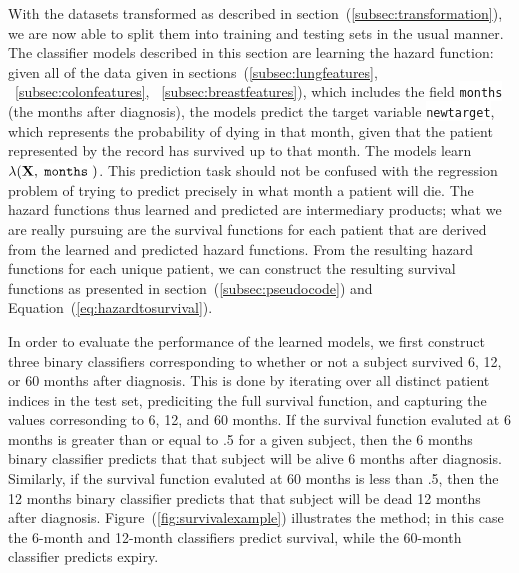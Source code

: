 \documentclass[a4paper,11pt]{article}
\newcommand{\codewhite}[1]{\colorbox{white}{\texttt{#1}}}
\begin{document}
With the datasets transformed as described in section~(\ref{subsec:transformation}), we are now able to split them into training and testing sets in the usual manner.
The classifier models described in this section are learning the hazard function: given all of the data given in sections~(\ref{subsec:lungfeatures}, ~\ref{subsec:colonfeatures}, ~\ref{subsec:breastfeatures}), which includes the field \codewhite{months} (the months after diagnosis), the models predict the target variable \codewhite{newtarget}, which represents the probability of dying in that month, given that the patient represented by the record has survived up to that month. The models learn $\lambda(\mathbf{X}, \codewhite{months})$.
This prediction task should not be confused with the regression problem of trying to predict precisely in what month a patient will die.
The hazard functions thus learned and predicted are intermediary products; what we are really pursuing are the survival functions for each patient that are derived from the learned and predicted hazard functions.
From the resulting hazard functions for each unique patient, we can construct the
resulting survival functions as presented in section~(\ref{subsec:pseudocode}) and Equation~(\ref{eq:hazardtosurvival}). %

In order to evaluate the performance of the learned models, we first construct three binary classifiers corresponding to whether or not a subject survived 6, 12, or 60 months after diagnosis. 
This is done by iterating over all distinct patient indices in the test set, prediciting the full survival function, and capturing the values corresonding to 6, 12, and 60 months.  
If the survival function evaluted at 6 months is greater than or equal to .5 for a given subject, then the 6 months binary classifier predicts that that subject will be alive 6 months after diagnosis. Similarly, if the survival function evaluted at 60 months is less than .5, then the 12 months binary classifier predicts that that subject will be dead 12 months after diagnosis. Figure~(\ref{fig:survivalexample}) illustrates the method; in this case the 6-month and 12-month classifiers predict survival, while the 60-month classifier predicts expiry.
\end{document}

